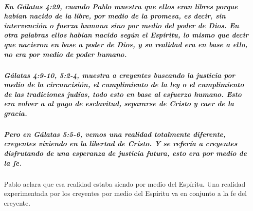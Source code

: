 \documentclass[11a pt,twoside]{article}
\def\textbf#1{#1}%
\let\oldsubparagraph\subparagraph
\renewcommand{\subparagraph}{\needspace{2\baselineskip}\oldsubparagraph}
\begin{document}
\subparagraph{\texorpdfstring{En Gálatas 4:29, cuando Pablo muestra que
ellos eran libres porque habían nacido de la libre, por medio de la
promesa, es decir, sin intervención o fuerza humana sino por medio del
poder de Dios. En otra palabras ellos habían nacido \textbf{según el
Espíritu}, lo mismo que decir que nacieron en base a poder de Dios, y su
realidad era en base a ello, no era por medio de poder
humano.}{En Gálatas 4:29, cuando Pablo muestra que ellos eran libres porque habían nacido de la libre, por medio de la promesa, es decir, sin intervención o fuerza humana sino por medio del poder de Dios. En otra palabras ellos habían nacido según el Espíritu, lo mismo que decir que nacieron en base a poder de Dios, y su realidad era en base a ello, no era por medio de poder humano.}}\label{en-guxe1latas-429-cuando-pablo-muestra-que-ellos-eran-libres-porque-habuxedan-nacido-de-la-libre-por-medio-de-la-promesa-es-decir-sin-intervenciuxf3n-o-fuerza-humana-sino-por-medio-del-poder-de-dios.-en-otra-palabras-ellos-habuxedan-nacido-seguxfan-el-espuxedritu-lo-mismo-que-decir-que-nacieron-en-base-a-poder-de-dios-y-su-realidad-era-en-base-a-ello-no-era-por-medio-de-poder-humano.}

\subparagraph{Gálatas 4:9-10, 5:2-4, muestra a creyentes buscando la
justicia por medio de la circuncisión, el cumplimiento de la ley o el
cumplimiento de las tradiciones judías, todo esto en base al esfuerzo
humano. Esto era volver a al yugo de esclavitud, separarse de Cristo y
caer de la
gracia.}\label{guxe1latas-49-10-52-4-muestra-a-creyentes-buscando-la-justicia-por-medio-de-la-circuncisiuxf3n-el-cumplimiento-de-la-ley-o-el-cumplimiento-de-las-tradiciones-juduxedas-todo-esto-en-base-al-esfuerzo-humano.-esto-era-volver-a-al-yugo-de-esclavitud-separarse-de-cristo-y-caer-de-la-gracia.}

\subparagraph{\texorpdfstring{Pero en Gálatas 5:5-6, vemos una realidad
totalmente diferente, creyentes viviendo en la libertad de Cristo. Y se
refería a creyentes disfrutando de una esperanza de justicia futura,
esto era \textbf{por medio de la
fe}.}{Pero en Gálatas 5:5-6, vemos una realidad totalmente diferente, creyentes viviendo en la libertad de Cristo. Y se refería a creyentes disfrutando de una esperanza de justicia futura, esto era por medio de la fe.}}\label{pero-en-guxe1latas-55-6-vemos-una-realidad-totalmente-diferente-creyentes-viviendo-en-la-libertad-de-cristo.-y-se-referuxeda-a-creyentes-disfrutando-de-una-esperanza-de-justicia-futura-esto-era-por-medio-de-la-fe.}

Pablo aclara que esa realidad estaba siendo \textbf{por medio del
Espíritu}. Una realidad experimentada por los creyentes por medio del
Espíritu va en conjunto a la fe del creyente.
\end{document}
